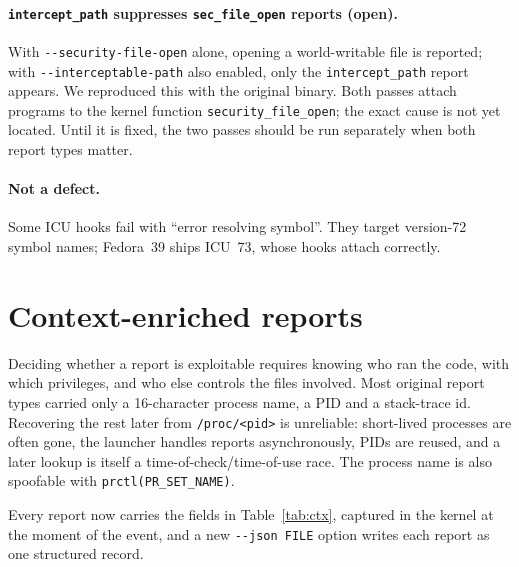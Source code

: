 \documentclass[11pt,a4paper]{article}
\newcommand{\pass}[1]{\texttt{#1}}
\begin{document}
\paragraph{\pass{intercept\_path} suppresses \pass{sec\_file\_open} reports (open).}
With \texttt{-{}-security-file-open} alone, opening a world-writable file is reported; with
\texttt{-{}-interceptable-path} also enabled, only the \pass{intercept\_path} report appears. We
reproduced this with the original binary. Both passes attach programs to the kernel function
\texttt{security\_file\_open}; the exact cause is not yet located. Until it is fixed, the two
passes should be run separately when both report types matter.

\paragraph{Not a defect.} Some ICU hooks fail with ``error resolving symbol''. They target
version-72 symbol names; Fedora~39 ships ICU~73, whose hooks attach correctly.

\section{Context-enriched reports}
\label{sec:ctx}

Deciding whether a report is exploitable requires knowing who ran the code, with which privileges,
and who else controls the files involved. Most original report types carried only a 16-character
process name, a PID and a stack-trace id. Recovering the rest later from \texttt{/proc/<pid>} is
unreliable: short-lived processes are often gone, the launcher handles reports asynchronously,
PIDs are reused, and a later lookup is itself a time-of-check/time-of-use race. The process name is
also spoofable with \texttt{prctl(PR\_SET\_NAME)}.

Every report now carries the fields in Table~\ref{tab:ctx}, captured in the kernel at the moment of
the event, and a new \texttt{-{}-json FILE} option writes each report as one structured record.
\end{document}
